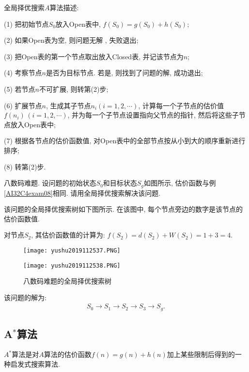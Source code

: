 全局择优搜索$A$算法描述:

   (1) 把初始节点$S_0$放入Open表中, $f(S_0)=g(S_0)+h(S_0)$;

   (2) 如果Open表为空, 则问题无解 , 失败退出;

   (3) 把Open表的第一个节点取出放入Closed表, 并记该节点为$n$;

   (4) 考察节点$n$是否为目标节点. 若是, 则找到了问题的解, 成功退出;

   (5) 若节点$n$不可扩展, 则转第(2)步;

   (6) 扩展节点$n$, 生成其子节点$n_i(i=1, 2,\cdots)$, 计算每一个子节点的估价值$f(n_i)\,(i=1, 2, \cdots)$, 并为每一个子节点设置指向父节点的指针, 然后将这些子节点放入Open表中;

   (7) 根据各节点的估价函数值, 对Open表中的全部节点按从小到大的顺序重新进行排序;

   (8) 转第(2)步.
\begin{example}
  八数码难题. 设问题的初始状态$S_0$和目标状态$S_g$如图所示, 估价函数与例\ref{AI32C4exam08}相同. 请用全局择优搜索解决该问题.
\end{example}
\begin{result}
  该问题的全局择优搜索树如下图所示. 在该图中, 每个节点旁边的数字是该节点的估价函数值.
\end{result}
\begin{example}
对节点$S_2$, 其估价函数值的计算为: $f(S_2)=d(S_2)+W(S_2) =1+3=4$.
\begin{figure}[H]
\centering
\texttt{[image: yushu2019112537.PNG]}
\caption{}
\label{AI32fig37}
\end{figure}
\end{example}
\begin{figure}[H]
\centering
\texttt{[image: yushu2019112538.PNG]}
\caption{八数码难题的全局择优搜索树}
\label{AI32fig38}
\end{figure}
该问题的解为:
\begin{align}
  S_0\rightarrow S_1\rightarrow S_2\rightarrow S_3\rightarrow S_g.
\end{align}
\subsection{A$^*$算法}
$A^*$算法是对$A$算法的估价函数$f(n)=g(n)+h(n)$加上某些限制后得到的一种启发式搜索算法.

